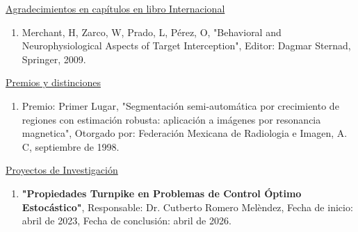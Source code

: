 \underline{\large Agradecimientos en capítulos en libro Internacional}

\begin{enumerate}[itemsep=-1mm]
\item Merchant, H, Zarco, W, Prado, L, Pérez, O, "Behavioral and Neurophysiological Aspects of Target
Interception", Editor: Dagmar Sternad, Springer, 2009.
\end{enumerate}


\underline{\large Premios y distinciones}

\begin{enumerate}[itemsep=-1mm]
\item Premio: Primer Lugar, "Segmentación semi-automática por crecimiento de regiones con
estimación robusta: aplicación a imágenes por resonancia magnetica", Otorgado por: Federación
Mexicana de Radiologia e Imagen, A. C, septiembre de 1998.
\end{enumerate}


\underline{\large Proyectos de Investigación}

\begin{enumerate}[itemsep=-1mm]
\item \textbf{"Propiedades Turnpike en Problemas de Control Óptimo Estocástico"}, Responsable: Dr. Cutberto Romero Melèndez, 
Fecha de inicio: abril de 2023, Fecha de conclusión: abril de 2026.
\end{enumerate}


